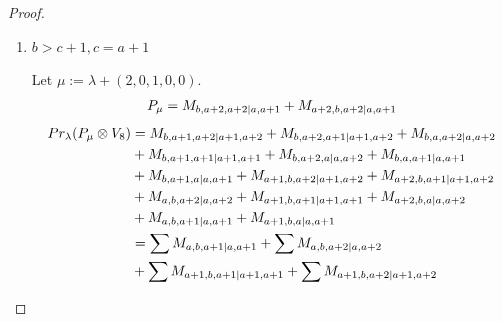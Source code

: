 \begin{proof}
\begin{enumerate}
\begin{enumerate}
        \item $b>c+1,c=a+1$ \par
        Let $\mu:=\lambda + (2,0,1,0,0) $.
        \begin{equation}\notag
          \begin{aligned}
            P_\mu = M_{b,a+2,a+2|a,a+1}
+ M_{a+2,b,a+2|a,a+1}
          \end{aligned}
        \end{equation}
        \begin{equation}\notag
          \begin{aligned}
            Pr_{\lambda}(P_\mu \otimes V_{8}) &=
M_{b,a+1,a+2|a+1,a+2}
+ M_{b,a+2,a+1|a+1,a+2}
+ M_{b,a,a+2|a,a+2}\\
                                              &
+ M_{b,a+1,a+1|a+1,a+1}
+ M_{b,a+2,a|a,a+2}
+ M_{b,a,a+1|a,a+1}\\
                                              &
+ M_{b,a+1,a|a,a+1}
+ M_{a+1,b,a+2|a+1,a+2}
+ M_{a+2,b,a+1|a+1,a+2}\\
                                              &
+ M_{a,b,a+2|a,a+2}
+ M_{a+1,b,a+1|a+1,a+1}
+ M_{a+2,b,a|a,a+2}\\
                                              &
+ M_{a,b,a+1|a,a+1}
+ M_{a+1,b,a|a,a+1} \\
                                               &=
\sum M_{a,b,a+1|a,a+1}
+ \sum M_{a,b,a+2|a,a+2}\\
                                               &
+ \sum M_{a+1,b,a+1|a+1,a+1}
+ \sum M_{a+1,b,a+2|a+1,a+2}
          \end{aligned}
        \end{equation}


\end{enumerate}
\end{enumerate}
\end{proof}
